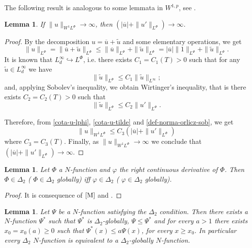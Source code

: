 \documentclass[twoside]{article}
\newtheorem{lem}[thm]{Lemma}
\theoremstyle{remark}
\newcommand{\orlnor}{\|_{L^{\Phi}}}
\newcommand{\lphi}{L^{\Phi}}
\newcommand{\sobnor}{\|_{W^{1}\lphi}}
\renewcommand{\leq}{\leqslant}
\renewcommand{\geq}{\geqslant}
\begin{document}
The following result is analogous to some lemmata in $W^{1,p}$, see \cite{xu2007some}.
\begin{lem}\label{infinito-a-prom-upunto}
If $\|u\sobnor\to \infty$, then $(|\overline{u}|+\|u'\orlnor)\to \infty$.
\end{lem}

\begin{proof}
By the decomposition $u=\overline{u}+\tilde{u}$ and some elementary operations,
we get
\begin{equation}\label{cota-u-lphi}
\|u\orlnor=
\|\overline{u}+\tilde{u}\orlnor\leq
\|\overline{u}\orlnor+\|\tilde{u}\orlnor=
|\overline{u}|\|1\orlnor+\|\tilde{u}\orlnor.
\end{equation}
It is known that $L^{\infty}_d\hookrightarrow\lphi$, i.e.
there exists $C_1=C_1(T)>0$ such that for any $\tilde{u}\in L^{\infty}_d$ we have
\[
\|\tilde{u}\orlnor
\leq
C_1 \|\tilde{u}\|_{L^{\infty}};
\]
and, applying  Sobolev's inequality,  we obtain Wirtinger's inequality, 
that is there exists $C_2=C_2(T)>0$ such that
\begin{equation}\label{cota-u-tilde}
\|\tilde{u}\orlnor
\leq
C_2\|u'\orlnor.
\end{equation}

Therefore, from \eqref{cota-u-lphi}, \eqref{cota-u-tilde} and \eqref{def-norma-orlicz-sob},
we get
\[
\|u\sobnor\leq
C_3(|\overline{u}|+\|u'\orlnor)
\]
where $C_3=C_3(T)$. Finally, as $\|u\sobnor\to \infty$ we conclude that
$(|\overline{u}|+\|u'\orlnor)\to \infty$.
\end{proof}

\begin{lem}\label{lema:delta_2 y der} Let $\Phi$ a $N$-function and $\varphi$ the right continuous derivative of $\Phi$. Then $\Phi\in\Delta_2$ (
$\Phi\in\Delta_2$ globally) iff $\varphi\in\Delta_2$ (
$\varphi\in\Delta_2$ globally).
\end{lem}
\begin{proof}  It is consequence of $\cite[Th. 11.7]{M}$ and \cite[Remark 5, p. 87]{M}.

\end{proof}

\begin{lem}\label{lem:delta2-equiv-delta2-global} Let $\Psi$ be a $N$-function satisfying the $\Delta_2$ condition. Then there exists a $N$-function $\Psi^*$  such that $\Psi^*$ is $\Delta_2$-globally, $\Psi\leq\Psi^*$ and for every $a>1$ there exists $x_0=x_0(a)\geq 0$ such that $\Psi^*(x)\leq a\Psi(x)$, for every $x\geq x_0$.  In particular every $\Delta_2$ $N$-function is equivalent to a $\Delta_2$-globally $N$-function.
\end{lem}
\end{document}
